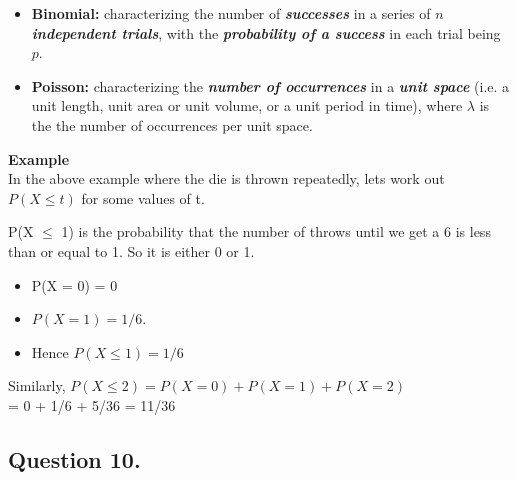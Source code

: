 \documentclass[]{report}
\begin{document}
\begin{enumerate}[(i)]
\begin{itemize}
{\begin{itemize}
		
		\item \textbf{Binomial:} characterizing the number of \textbf{\emph{successes}} in a series of \textbf{\emph{$n$ independent trials}}, with the \textbf{\emph{probability of a success}} in each trial being $p$.
		
		\item \textbf{Poisson:}  characterizing the \textbf{\emph{number of occurrences}} in a \textbf{\emph{unit space}} (i.e. a unit length, unit area or unit volume, or a unit period in time), where $\lambda$ is the the number of occurrences per unit space.
		
	\end{itemize}
}



















\textbf{Example}\\

In the above example where the die is thrown repeatedly, lets work out $P(X \leq t)$ for some values of t.

P(X $\leq$ 1) is the probability that the number of throws until we get a 6 is less than or equal to 1. So it is either 0 or 1. 

\begin{itemize}
	\item P(X = 0) = 0 
	\item $P(X = 1) = 1/6$.
	\item  Hence $P(X \leq 1) = 1/6$
\end{itemize}

Similarly, $P(X \leq 2) = P(X = 0) + P(X = 1) + P(X = 2)$\\ = 0 + 1/6 + 5/36 = 11/36



	
\subsection*{Question 10. } %


\end{itemize}
\end{enumerate}
\end{document}
